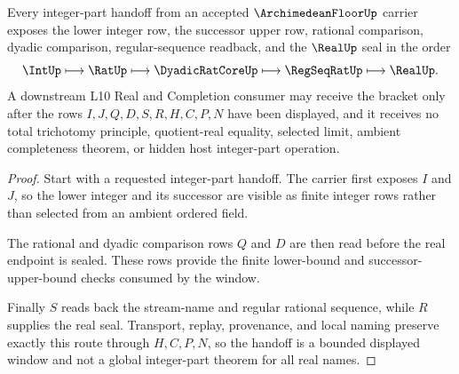 \begin{theorem}
\label{thm:archimedean-floor-window-extraction}
Every integer-part handoff from an accepted $\ArchimedeanFloorUp$ carrier exposes the lower integer row, the successor upper row, rational comparison, dyadic comparison, regular-sequence readback, and the $\RealUp$ seal in the order
$$
\IntUp \longmapsto \RatUp \longmapsto \DyadicRatCoreUp \longmapsto \RegSeqRatUp \longmapsto \RealUp.
$$
A downstream L10 Real and Completion consumer may receive the bracket only after the rows $I,J,Q,D,S,R,H,C,P,N$ have been displayed, and it receives no total trichotomy principle, quotient-real equality, selected limit, ambient completeness theorem, or hidden host integer-part operation.
\end{theorem}
\begin{proof}
Start with a requested integer-part handoff. The carrier first exposes $I$ and $J$, so the lower integer and its successor are visible as finite integer rows rather than selected from an ambient ordered field.

The rational and dyadic comparison rows $Q$ and $D$ are then read before the real endpoint is sealed. These rows provide the finite lower-bound and successor-upper-bound checks consumed by the window.

Finally $S$ reads back the stream-name and regular rational sequence, while $R$ supplies the real seal. Transport, replay, provenance, and local naming preserve exactly this route through $H,C,P,N$, so the handoff is a bounded displayed window and not a global integer-part theorem for all real names.
\end{proof}




